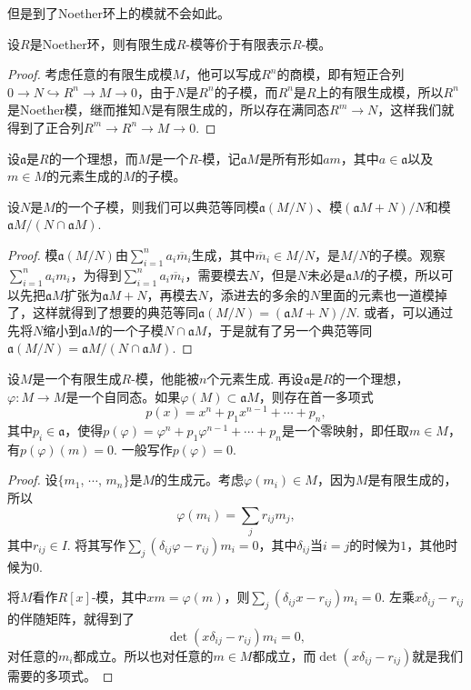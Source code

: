 但是到了Noether环上的模就不会如此。

\begin{pro}
	设$R$是Noether环，则有限生成$R$-模等价于有限表示$R$-模。
\end{pro}

\begin{proof}
	考虑任意的有限生成模$M$，他可以写成$R^n$的商模，即有短正合列$0\to N \hookrightarrow R^n \to M\to 0$，由于$N$是$R^n$的子模，而$R^n$是$R$上的有限生成模，所以$R^n$是Noether模，继而推知$N$是有限生成的，所以存在满同态$R^m\to N$，这样我们就得到了正合列$R^m\to R^n\to M\to 0$.
\end{proof}

\para 设$\mathfrak{a}$是$R$的一个理想，而$M$是一个$R$-模，记$\mathfrak{a}M$是所有形如$am$，其中$a\in \mathfrak{a}$以及$m\in M$的元素生成的$M$的子模。\endpara

\begin{lem}
	设$N$是$M$的一个子模，则我们可以典范等同模$\mathfrak{a}(M/N)$、模$(\mathfrak{a}M+N)/N$和模$\mathfrak{a}M/(N\cap \mathfrak{a}M)$.
\end{lem}

\begin{proof}
	模$\mathfrak{a}(M/N)$由$\sum_{i=1}^n a_i\overline{m}_i$生成，其中$\overline{m}_i\in M/N$，是$M/N$的子模。观察$\sum_{i=1}^n a_i m_i$，为得到$\sum_{i=1}^n a_i\overline{m}_i$，需要模去$N$，但是$N$未必是$\mathfrak{a}M$的子模，所以可以先把$\mathfrak{a}M$扩张为$\mathfrak{a}M+N$，再模去$N$，添进去的多余的$N$里面的元素也一道模掉了，这样就得到了想要的典范等同$\mathfrak{a}(M/N)=(\mathfrak{a}M+N)/N$. 或者，可以通过先将$N$缩小到$\mathfrak{a}M$的一个子模$N\cap \mathfrak{a}M$，于是就有了另一个典范等同$\mathfrak{a}(M/N)=\mathfrak{a}M/(N\cap \mathfrak{a}M)$.
\end{proof}

\begin{thm}\label{Hamilton-Cayley}
设$M$是一个有限生成$R$-模，他能被$n$个元素生成. 再设$\mathfrak{a}$是$R$的一个理想，$\varphi:M\to M$是一个自同态。如果$\varphi(M)\subset \mathfrak{a}M$，则存在首一多项式
\[
	p(x)=x^n+p_1x^{n-1}+\cdots+p_n,
\]
其中$p_i\in \mathfrak{a}$，使得$p(\varphi)=\varphi^n+p_1\varphi^{n-1}+\cdots+p_n$是一个零映射，即任取$m\in M$，有$p(\varphi)(m)=0$. 一般写作$p(\varphi)=0$.
\end{thm}

\begin{proof}
	设$\{m_1$, $\cdots$, $m_n\}$是$M$的生成元。考虑$\varphi(m_i)\in M$，因为$M$是有限生成的，所以
	\[
	\varphi(m_i)=\sum_{j}r_{ij}m_j,
	\]
	其中$r_{ij}\in I$. 将其写作$\sum_{j}(\delta_{ij}\varphi-r_{ij})m_i=0$，其中$\delta_{ij}$当$i=j$的时候为$1$，其他时候为$0$.

	将$M$看作$R[x]$-模，其中$xm=\varphi(m)$，则$\sum_{j}(\delta_{ij}x-r_{ij})m_i=0$. 左乘$x\delta_{ij}-r_{ij}$的伴随矩阵，就得到了
	\[
	\det\left(x\delta_{ij}-r_{ij}\right)m_i=0,
	\]
	对任意的$m_i$都成立。所以也对任意的$m\in M$都成立，而$\det\left(x\delta_{ij}-r_{ij}\right)$就是我们需要的多项式。
\end{proof}

